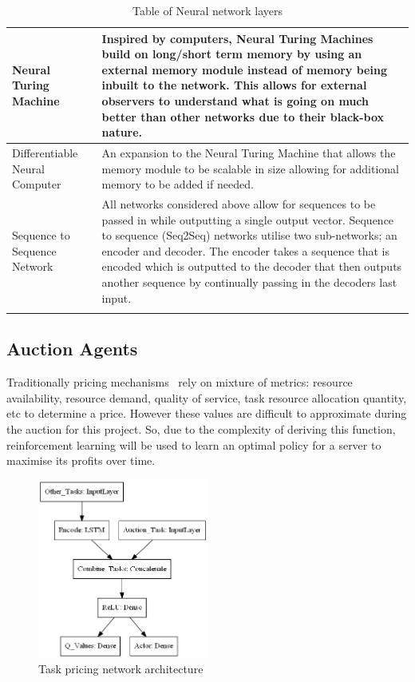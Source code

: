 \begin{longtable}{|p{3.5cm}|p{12cm}|}
    Neural Turing Machine~\citep{NTM} & Inspired by computers, Neural Turing Machines build on long/short term memory
        by using an external memory module instead of memory being inbuilt to the network. This allows for external
        observers to understand what is going on much better than other networks due to their black-box nature. \\ \hline

    Differentiable Neural Computer~\citep{DNC} & An expansion to the Neural Turing Machine that allows the memory
        module to be scalable in size allowing for additional memory to be added if needed. \\ \hline

    Sequence to Sequence Network \citep{seq2seq} & All networks considered above allow for sequences to be passed in
        while outputting a single output vector. Sequence to sequence (Seq2Seq) networks utilise two sub-networks; an
        encoder and decoder. The encoder takes a sequence that is encoded which is outputted to the decoder that then
        outputs another sequence by continually passing in the decoders last input. \\ \hline
    \caption{Table of Neural network layers}
    \label{tab:neural-network-layers}
\end{longtable}

\subsection{Auction Agents}
\label{subsec:auction-agents}
Traditionally pricing mechanisms~\citep{al2013cloud} rely on mixture of metrics: resource availability, resource demand,
quality of service, task resource allocation quantity, etc to determine a price. However
these values are difficult to approximate during the auction for this project. So, due to the complexity of
deriving this function, reinforcement learning will be used to learn an optimal policy for a server to maximise its
profits over time.

\begin{figure}[H]
    \centering
    \includegraphics[width=0.5\textwidth]{figures/3_solution_figs/task_pricing_network_architecture.png}
    \caption{Task pricing network architecture}
    \label{fig:task-pricing-network-architecture}
\end{figure}

